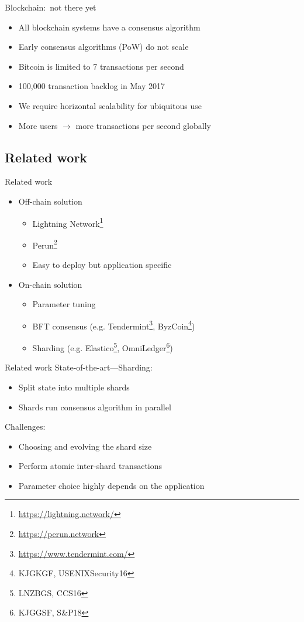 \documentclass{beamer}
\begin{document}
\begin{frame}{Blockchain:~not there yet}
  \begin{itemize}
    \item All blockchain systems have a consensus algorithm
    \item Early consensus algorithms (PoW) do not scale
    \item Bitcoin is limited to 7 transactions per second
    \item 100,000 transaction backlog in May 2017
    \item We require horizontal scalability for ubiquitous use
    \item More users $\rightarrow$ more transactions per second globally
  \end{itemize}
\end{frame}

\subsection{Related work}
\begin{frame}{Related work}
    \begin{itemize}
        \item Off-chain solution
            \begin{itemize}
                \item Lightning Network\footnote{\url{https://lightning.network/}}
                \item Perun\footnote{\url{https://perun.network}}
                \item Easy to deploy but application specific
            \end{itemize}
        \item On-chain solution
            \begin{itemize}
                \item Parameter tuning
                \item BFT consensus (e.g. Tendermint\footnote{\url{https://www.tendermint.com/}}, ByzCoin\footnote{KJGKGF, USENIXSecurity16})
                \item Sharding (e.g. Elastico\footnote{LNZBGS, CCS16}, OmniLedger\footnote{KJGGSF, S\&P18})
            \end{itemize}
    \end{itemize}
\end{frame}

\begin{frame}{Related work}
  State-of-the-art---Sharding:
  \begin{itemize}
  \item Split state into multiple shards
  \item Shards run consensus algorithm in parallel
  \end{itemize}
  Challenges:
  \begin{itemize}
      \item Choosing and evolving the shard size
      \item Perform atomic inter-shard transactions
      \item Parameter choice highly depends on the application
  \end{itemize}
\end{frame}
\end{document}
